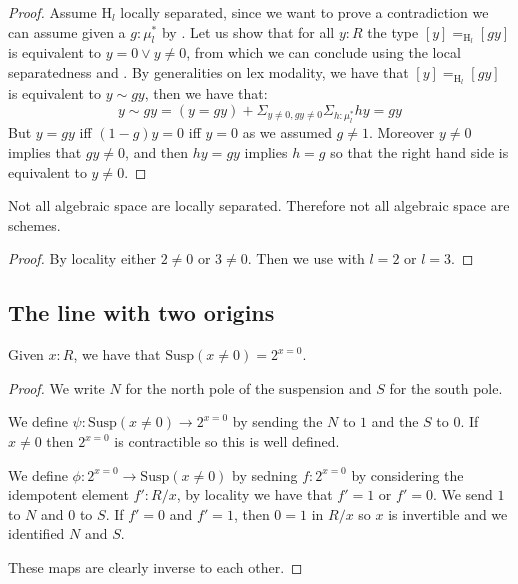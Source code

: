 \begin{proof}
Assume $\mathrm{H}_l$ locally separated, since we want to prove a contradiction we can assume given a $g:\mu_l^*$ by . Let us show that for all $y:R$ the type $[y]=_{\mathrm{H}_l} [gy]$ is equivalent to $y=0\lor y\not=0$, from which we can conclude using the local separatedness and . By generalities on lex modality, we have that $[y]=_{\mathrm{H}_l} [gy]$ is equivalent to $y\sim gy$, then we have that:
\[y\sim gy = (y=gy) + \Sigma_{y\not= 0,gy\not=0}\Sigma_{h:\mu_l^*}hy=gy\]
But $y=gy$ iff $(1-g)y=0$ iff $y=0$ as we assumed $g\not=1$. Moreover $y\not=0$ implies that $gy\not=0$, and then $hy=gy$ implies $h=g$ so that the right hand side is equivalent to $y\not=0$.
\end{proof}

\begin{corollary}
Not all algebraic space are locally separated. Therefore not all algebraic space are schemes.
\end{corollary}

\begin{proof}
By locality either $2\not=0$ or $3\not=0$. Then we use  with $l=2$ or $l=3$.
\end{proof}


\subsection{The line with two origins}

\begin{lemma}
Given $x:R$, we have that $\mathrm{Susp}(x\not=0) = 2^{x=0}$.
\end{lemma}

\begin{proof}
We write $N$ for the north pole of the suspension and $S$ for the south pole.

We define $\psi : \mathrm{Susp}(x\not=0)\to 2^{x=0}$ by sending the $N$ to $1$ and the $S$ to $0$. If $x\not=0$ then $2^{x=0}$ is contractible so this is well defined.

We define $\phi : 2^{x=0}\to \mathrm{Susp}(x\not=0)$ by sedning $f:2^{x=0}$ by considering the idempotent element $f':R/x$, by locality we have that $f'=1$ or $f'=0$. We send $1$ to $N$ and $0$ to $S$. If $f'=0$ and $f'=1$, then $0=1$ in $R/x$ so $x$ is invertible and we identified $N$ and $S$.

These maps are clearly inverse to each other.
\end{proof}

